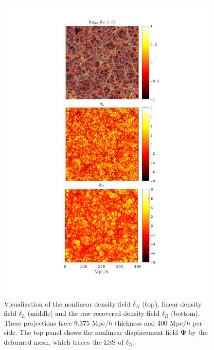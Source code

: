 \documentclass[aps,prd,twocolumn,superscriptaddress,amsfont,amssymb,amsmath,nofootinbib,showpacs,balancelastpage]{revtex4-1}
\newcommand{\bs}{\boldsymbol}
\begin{document}
\begin{figure}
 \centering
  \includegraphics[width=0.95\linewidth]{proj.pdf}
  \caption{Visualization of the nonlinear density field $\delta_N$ (top),
  linear density field $\delta_L$ (middle) and the raw recovered density
  field $\delta_R$ (bottom). These projections have 9.375 Mpc$/h$ thickness
  and 400 Mpc$/h$ per side. The top panel shows the nonlinear displacement
  field $\bs\Psi$ by the deformed mesh, which traces the LSS of $\delta_N$.}
  \label{fig.projection}
\end{figure}
\end{document}
